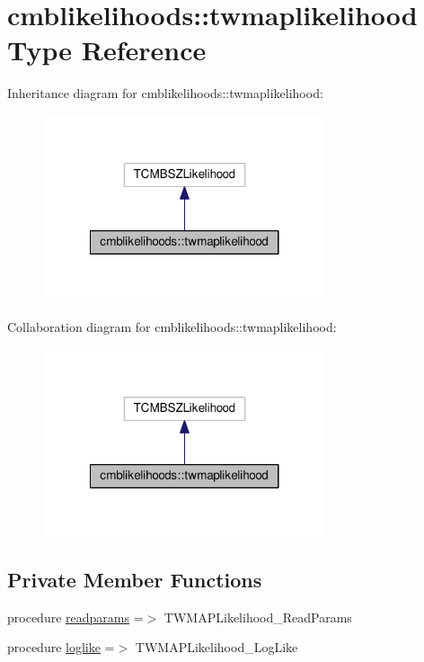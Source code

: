 \hypertarget{structcmblikelihoods_1_1twmaplikelihood}{}\section{cmblikelihoods\+:\+:twmaplikelihood Type Reference}
\label{structcmblikelihoods_1_1twmaplikelihood}


Inheritance diagram for cmblikelihoods\+:\+:twmaplikelihood\+:
\nopagebreak
\begin{figure}[H]
\begin{center}
\leavevmode
\includegraphics[width=236pt]{structcmblikelihoods_1_1twmaplikelihood__inherit__graph}
\end{center}
\end{figure}


Collaboration diagram for cmblikelihoods\+:\+:twmaplikelihood\+:
\nopagebreak
\begin{figure}[H]
\begin{center}
\leavevmode
\includegraphics[width=236pt]{structcmblikelihoods_1_1twmaplikelihood__coll__graph}
\end{center}
\end{figure}
\subsection*{Private Member Functions}
\begin{DoxyCompactItemize}
\item 
procedure \mbox{\hyperlink{structcmblikelihoods_1_1twmaplikelihood_a64795c1c3dcfaf968d1caa1742283c58}{readparams}} =$>$ T\+W\+M\+A\+P\+Likelihood\+\_\+\+Read\+Params
\item 
procedure \mbox{\hyperlink{structcmblikelihoods_1_1twmaplikelihood_a4b40206256593e631259053a1ce173e0}{loglike}} =$>$ T\+W\+M\+A\+P\+Likelihood\+\_\+\+Log\+Like
\end{DoxyCompactItemize}


